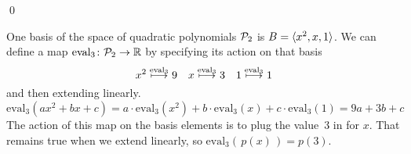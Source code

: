 \documentclass[10pt,t,serif,professionalfont]{beamer}
\begin{document}
\begin{frame}
\th[th:HomoDetActOnBasis]

\pause
\pf
{}

\pause
{}
\end{frame}
\begin{frame}
\qed
\end{frame}




\begin{frame}
\ex 
One basis of the space of quadratic polynomials $\mathcal{P}_2$
is $B=\langle x^2,x,1\rangle$.
We can define a map $\mbox{$\text{eval}_3\colon \mathcal{P}_2\to \mathbb{R}$}$ 
by specifying its action on that basis
\begin{equation*}
  x^2\stackrel{\text{eval}_3}{\longmapsto}9
  \quad
  x\stackrel{\text{eval}_3}{\longmapsto}3
  \quad
  1\stackrel{\text{eval}_3}{\longmapsto}1
\end{equation*}
and then extending linearly.
\begin{equation*}
  \text{eval}_3(ax^2+bx+c)=a\cdot\text{eval}_3(x^2)
                          +b\cdot\text{eval}_3(x)
                          +c\cdot\text{eval}_3(1)
          =9a+3b+c
\end{equation*}
\pause
The action of this map on the basis elements is to plug the value~$3$ in for
$x$. 
That remains true when we extend linearly, so
$\text{eval}_3(\,p(x)\,)=p(3)$.
\end{frame}
\end{document}
